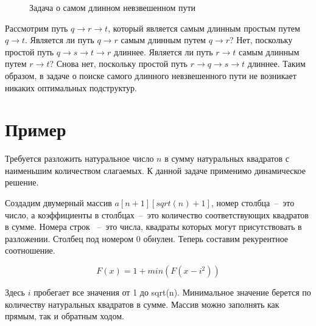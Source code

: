 \documentclass[a4paper,12pt] {report} 			%
\begin{document}
\begin{figure} [h]
\caption{Задача о самом длинном невзвешенном пути}
\end{figure}

Рассмотрим путь $q \rightarrow r \rightarrow t$, который является самым длинным простым путем $q \longrightarrow t$. 
Является ли путь $q\rightarrow r$ самым длинным путем $q \longrightarrow r$? Нет, поскольку простой путь $q \rightarrow s \rightarrow t \rightarrow r$ длиннее. 
Является ли путь $r \rightarrow t$ самым длинным путем $r \longrightarrow t$? Снова нет, поскольку простой 
путь $r \rightarrow q \rightarrow s \rightarrow t$ длиннее. Таким образом, в задаче о поиске самого длинного 
невзвешенного пути не возникает никаких оптимальных подструктур.

\section{Пример}

Требуется разложить натуральное число $n$ в сумму натуральных квадратов с наименьшим 
количеством слагаемых. К данной задаче применимо динамическое решение.

Создадим двумерный массив $a[n + 1][sqrt(n) + 1]$, номер столбца~--~это число, а коэффициенты в столбцах~--~это количество 
соответствующих квадратов в сумме. Номера строк ~--~это числа, квадраты которых могут присутствовать в разложении. 
Столбец под номером 0 обнулен. Теперь составим рекурентное соотношение.

$$F(x) = 1 + min(F(x - i^2))$$

Здесь $i$ пробегает все значения от 1 до sqrt(n). Минимальное значение берется по количеству 
натуральных квадратов в сумме. Массив можно заполнять как прямым, так и обратным ходом.
\end{document}
